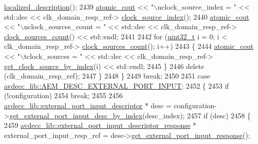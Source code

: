 \begin{DoxyCode}
      \hyperlink{classavdecc__lib_1_1clock__domain__descriptor__response_a1fb9de45567df344090a1407aa6b775f}{localized\_description}();
2439             \hyperlink{cmd__line_8h_a0bc38ccc65c79ba06c6fcd7b4bf554c3}{atomic\_cout} << \textcolor{stringliteral}{"\(\backslash\)nclock\_source\_index = "} << std::dec << clk\_domain\_resp\_ref->
      \hyperlink{classavdecc__lib_1_1clock__domain__descriptor__response_ad8ab5475f732fd4a64d51d9a2010ade5}{clock\_source\_index}();
2440             \hyperlink{cmd__line_8h_a0bc38ccc65c79ba06c6fcd7b4bf554c3}{atomic\_cout} << \textcolor{stringliteral}{"\(\backslash\)nclock\_sources\_count = "} << std::dec << clk\_domain\_resp\_ref->
      \hyperlink{classavdecc__lib_1_1clock__domain__descriptor__response_aa0b491746924156b188aadca22d0938f}{clock\_sources\_count}() << std::endl;
2441 
2442             \textcolor{keywordflow}{for} (\hyperlink{parse_8c_a6eb1e68cc391dd753bc8ce896dbb8315}{uint32\_t} i = 0; i < clk\_domain\_resp\_ref->
      \hyperlink{classavdecc__lib_1_1clock__domain__descriptor__response_aa0b491746924156b188aadca22d0938f}{clock\_sources\_count}(); i++)
2443             \{
2444                 \hyperlink{cmd__line_8h_a0bc38ccc65c79ba06c6fcd7b4bf554c3}{atomic\_cout} << \textcolor{stringliteral}{"\(\backslash\)tclock\_sources = "} << std::dec << clk\_domain\_resp\_ref->
      \hyperlink{classavdecc__lib_1_1clock__domain__descriptor__response_a1ea52be8698ee7b8efd364de5b30a82f}{get\_clock\_source\_by\_index}(i) << std::endl;
2445             \}
2446             \textcolor{keyword}{delete} (clk\_domain\_resp\_ref);
2447         \}
2448     \}
2449     \textcolor{keywordflow}{break};
2450 
2451     \textcolor{keywordflow}{case} \hyperlink{namespaceavdecc__lib_ac7b7d227e46bc72b63ee9e9aae15902fafd26fe044fb2548e13163acbfad1812c}{avdecc\_lib::AEM\_DESC\_EXTERNAL\_PORT\_INPUT}:
2452     \{
2453         \textcolor{keywordflow}{if} (!configuration)
2454             \textcolor{keywordflow}{break};
2455 
2456         \hyperlink{classavdecc__lib_1_1external__port__input__descriptor}{avdecc\_lib::external\_port\_input\_descriptor} * desc = 
      configuration->\hyperlink{classavdecc__lib_1_1configuration__descriptor_a0ce53511b68efa1e6e992431faac667e}{get\_external\_port\_input\_desc\_by\_index}(desc\_index);
2457         \textcolor{keywordflow}{if} (desc)
2458         \{
2459             \hyperlink{classavdecc__lib_1_1external__port__input__descriptor__response}{avdecc\_lib::external\_port\_input\_descriptor\_response}
       * external\_port\_input\_resp\_ref = desc->\hyperlink{classavdecc__lib_1_1external__port__input__descriptor_a9402343ba692ce790343f2b5cbcef0c7}{get\_external\_port\_input\_response}();

\end{DoxyCode}
